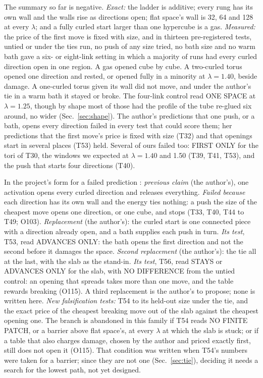 \documentclass[aps,pre,10pt,twocolumn,superscriptaddress,nofootinbib]{revtex4-2}
\begin{document}
The summary so far is negative. \emph{Exact:} the ladder is additive; every rung has its own wall and the walls
rise as directions open; flat space's wall is 32, 64 and 128 at every $\lambda$; and a fully curled start larger than
one hypercube is a gas. \emph{Measured:} the price of the first move is fixed with size, and in thirteen
pre-registered tests, untied or under the ties run, no push of any size tried, no bath size and no warm bath gave a
six- or eight-link setting in which a majority of runs had every curled direction open in one region. A gas opened
cube by cube. A two-curled torus opened one direction and rested, or opened fully in a minority at $\lambda = 1.40$,
beside damage. A one-curled torus given its wall did not move, and under the author's tie in a warm bath it stayed or
broke. The four-link control read ONE SPACE at $\lambda = 1.25$, though by shape most of those had the profile of the tube
re-glued six around, no wider (Sec.~\ref{sec:shape}). The author's predictions that one push, or a bath, opens every direction failed in every test that
could score them; her
predictions that the first move's price is fixed with size (T32) and that openings start in several places (T53)
held. Several of ours failed too: FIRST ONLY for the tori of T30, the windows we expected at $\lambda = 1.40$ and
1.50 (T39, T41, T53), and the push that starts four directions (T40).

In the project's form for a failed prediction \cite{repo}: \emph{previous claim} (the author's), one activation
opens every curled direction and releases everything. \emph{Failed because} each direction has its own wall and the
energy ties nothing: a push the size of the cheapest move opens one direction, or one cube, and stops (T33, T40, T44
to T49; O103). \emph{Replacement} (the author's): the curled start is one connected piece with a direction already
open, and a bath supplies each push in turn. \emph{Its test}, T53, read ADVANCES ONLY: the bath opens the first
direction and not the second before it damages the space. \emph{Second replacement} (the author's): the tie all at
the last, with the slab as the stand-in. \emph{Its test}, T56, read STAYS or ADVANCES ONLY for the slab, with NO
DIFFERENCE from the untied control: an opening that spreads takes more than one move, and the table rewards
breaking (O115). A
third replacement is the author's to propose; none is written here. \emph{New falsification tests:} T54 to its
held-out size under the tie, and the exact price of the cheapest breaking move out of the slab against the cheapest
opening one. The branch is abandoned in this family if T54 reads NO FINITE PATCH, or a barrier above flat space's,
at every $\lambda$ at which the slab is stuck; or if a table that also charges damage, chosen by the author and
priced exactly first, still does not open it (O115). That condition was written when T54's numbers were taken for a
barrier; since they are not one (Sec.~\ref{sec:tie}), deciding it needs a search for the lowest path, not yet
designed.
\end{document}
